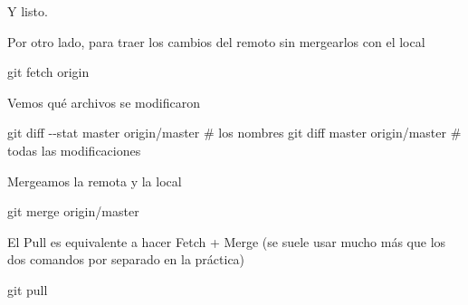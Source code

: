\documentclass[
  letterpaper,
  DIV=11,
  numbers=noendperiod]{scrartcl}
\newenvironment{Shaded}{\begin{snugshade}}{\end{snugshade}}
\newcommand{\CommentTok}[1]{\textcolor[rgb]{0.37,0.37,0.37}{#1}}
\newcommand{\FunctionTok}[1]{\textcolor[rgb]{0.28,0.35,0.67}{#1}}
\newcommand{\NormalTok}[1]{\textcolor[rgb]{0.00,0.23,0.31}{#1}}
\newcommand{\OperatorTok}[1]{\textcolor[rgb]{0.37,0.37,0.37}{#1}}
\begin{document}
Y listo.

Por otro lado, para traer los cambios del remoto sin mergearlos con el
local

\begin{Shaded}
\begin{Highlighting}[]
\NormalTok{git fetch origin}
\end{Highlighting}
\end{Shaded}

Vemos qué archivos se modificaron

\begin{Shaded}
\begin{Highlighting}[]
\NormalTok{git }\FunctionTok{diff} \OperatorTok{{-}{-}}\NormalTok{stat master origin}\OperatorTok{/}\NormalTok{master }\CommentTok{\# los nombres}
\NormalTok{git }\FunctionTok{diff}\NormalTok{ master origin}\OperatorTok{/}\NormalTok{master }\CommentTok{\# todas las modificaciones}
\end{Highlighting}
\end{Shaded}

Mergeamos la remota y la local

\begin{Shaded}
\begin{Highlighting}[]
\NormalTok{git merge origin}\OperatorTok{/}\NormalTok{master}
\end{Highlighting}
\end{Shaded}

El Pull es equivalente a hacer Fetch + Merge (se suele usar mucho más
que los dos comandos por separado en la práctica)

\begin{Shaded}
\begin{Highlighting}[]
\NormalTok{git pull}
\end{Highlighting}
\end{Shaded}
\end{document}
